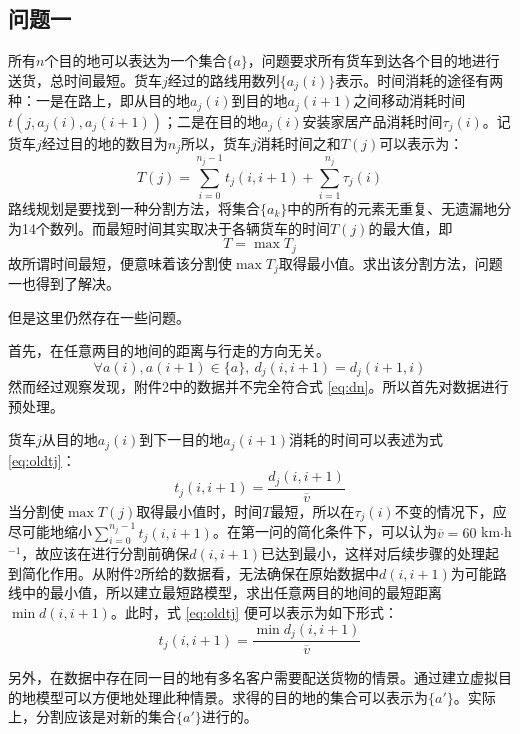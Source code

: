 \documentclass[UTF8,cs4size]{ctexart}
\begin{document}
\subsection{问题一}
所有$n$个目的地可以表达为一个集合$\{a\}$，问题要求所有货车到达各个目的地进行送货，总时间最短。货车$j$经过的路线用数列$\{a_{j}(i)\}$表示。时间消耗的途径有两种：一是在路上，即从目的地$a_{j}(i)$到目的地$a_{j}(i+1)$之间移动消耗时间$t(j, a_{j}(i) , a_{j}(i+1))$；二是在目的地$a_{j}(i)$安装家居产品消耗时间$\tau _j(i)$。记货车$j$经过目的地的数目为$n_j$所以，货车$j$消耗时间之和$T(j)$可以表示为：
\begin{equation}\label{eq:q1u}
  T(j) = \sum_{i=0}^{n_j-1}t_{j}(i , i+1) + \sum_{i=1}^{n_j}\tau _{j} (i)
\end{equation}
路线规划是要找到一种分割方法，将集合$\{a_k\}$中的所有的元素无重复、无遗漏地分为14个数列。而最短时间其实取决于各辆货车的时间$T(j)$的最大值，即
\begin{equation*}
  T = \max T_j
\end{equation*}
故所谓时间最短，便意味着该分割使$\max T_j$取得最小值。求出该分割方法，问题一也得到了解决。

但是这里仍然存在一些问题。

首先，在任意两目的地间的距离与行走的方向无关。
\begin{equation}
  \forall a(i),a(i+1) \in \{a\},\ d_j(i, i+1)=d_j(i+1, i) \label{eq:dn}
\end{equation}
然而经过观察发现，附件2中的数据并不完全符合式 \ref{eq:dn}。所以首先对数据进行预处理。

货车$j$从目的地$a_{j}(i)$到下一目的地$a_{j}(i+1)$消耗的时间可以表述为式 \ref{eq:oldtj}：
\begin{equation}
 t _{j}(i,i+1) = \frac{d_j(i,i+1)}{\overline{v}} \label{eq:oldtj}
\end{equation}
当分割使$\max T(j)$取得最小值时，时间$T$最短，所以在$\tau _j(i)$不变的情况下，应尽可能地缩小$\sum_{i=0}^{n_j-1}t _{j}(i,i+1)$。在第一问的简化条件下，可以认为$\overline{v} = 60$ km$\cdot$h$^{-1}$，故应该在进行分割前确保$d(i,i+1)$已达到最小，这样对后续步骤的处理起到简化作用。从附件2所给的数据看，无法确保在原始数据中$d(i,i+1)$为可能路线中的最小值，所以建立最短路模型，求出任意两目的地间的最短距离$\min d(i,i+1)$。此时，式 \ref{eq:oldtj} 便可以表示为如下形式：
\begin{equation}
  t _j(i,i+1) = \frac{\min d_j(i,i+1)}{\overline{v}} \label{eq:mtj}
\end{equation}

另外，在数据中存在同一目的地有多名客户需要配送货物的情景。通过建立虚拟目的地模型可以方便地处理此种情景。求得的目的地的集合可以表示为$\{a'\}$。实际上，分割应该是对新的集合$\{a'\}$进行的。
\end{document}
